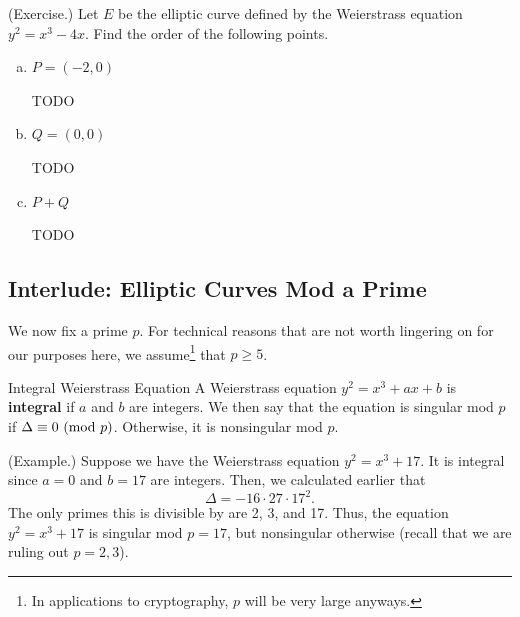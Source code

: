 \documentclass[letterpaper]{article}
\begin{document}
\begin{mdframed}
    (Exercise.) Let $E$ be the elliptic curve defined by the Weierstrass equation $y^2 = x^3 - 4x$. Find the order of the following points. 
    \begin{enumerate}[(a)]
        \item $P = (-2, 0)$
        \begin{mdframed}
            TODO 
        \end{mdframed}
        \item $Q = (0, 0)$
        \begin{mdframed}
            TODO 
        \end{mdframed}
        \item $P + Q$
        \begin{mdframed}
            TODO 
        \end{mdframed}
    \end{enumerate}
\end{mdframed}


\subsection{Interlude: Elliptic Curves Mod a Prime}
We now fix a prime $p$. For technical reasons that are not worth lingering on for our purposes here, we assume\footnote{In applications to cryptography, $p$ will be very large anyways.} that $p \geq 5$. 

\begin{definition}{Integral Weierstrass Equation}{}
    A Weierstrass equation $y^2 = x^3 + ax + b$ is \textbf{integral} if $a$ and $b$ are integers. We then say that the equation is singular mod $p$ if $\Delta \equiv 0 \ (\mathrm{mod}\ p)$. Otherwise, it is nonsingular mod $p$. 
\end{definition}

\begin{mdframed}
    (Example.) Suppose we have the Weierstrass equation $y^2 = x^3 + 17$. It is integral since $a = 0$ and $b = 17$ are integers. Then, we calculated earlier that \[\Delta = -16 \cdot 27 \cdot 17^2.\] The only primes this is divisible by are 2, 3, and 17. Thus, the equation $y^2 = x^3 + 17$ is singular mod $p = 17$, but nonsingular otherwise (recall that we are ruling out $p = 2, 3$).
\end{mdframed}
\end{document}
